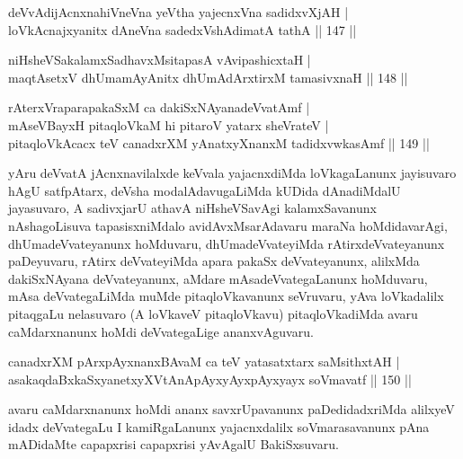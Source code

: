 \begin{shl}
deVvAdijAcnxnahiVneVna yeV\s tha yajecnxVna sadidxvXjAH | \\
loVkAcnajxyanitx dAneVna sadedxVshAdimatA tathA \hfill|| 147 || 
\end{shl}

\begin{shl}
niHsheVSakalamxSadhavxMsitapasA vA\s vipashicxtaH | \\
maqtAsetxV dhUmamAyAnitx dhUmAdArxtirxM tamasivxnaH \hfill|| 148 || 
\end{shl}

\begin{shl}
rAterxVraparapakaSxM ca dakiSxNAyanadeVvatAmf | \\
mAseVBayxH pitaqloVkaM hi pitaroV yatarx sheVrateV | \\
pitaqloVkAcacx teV canadxrXM yAnatxyXnanxM tadidxvwkasAmf \hfill|| 149 || 
\end{shl}

\begin{artha}
yAru deVvatA jAcnxnavilalxde keVvala yajacnxdiMda loVkagaLanunx
jayisuvaro hAgU satfpAtarx, deVsha modalAdavugaLiMda kUDida
dAnadiMdalU jayasu\-varo, A sadivxjarU athavA niHsheVSavAgi
kalamxSavanunx nAshagoLisuva tapasisx\-niMdalo avidAvxMsarAdavaru maraNa
hoMdidavarAgi, dhUmadeVvateyanunx hoMduvaru, dhUmadeVvateyiMda
rAtirxdeVvateyanunx paDeyuvaru, rAtirx deVvateyiMda apara pakaSx
deVvateyanunx, alilxMda dakiSxNAyana deVvateyanunx, aMdare
mAsadeVvate\-gaLanunx hoMduvaru, mAsa deVvategaLiMda muMde
pitaqloVkavanunx seVruvaru, yAva loVkadalilx pitaqgaLu nelasuvaro
(A loVkaveV pitaqloVkavu) pitaqloVkadiMda avaru caMdarxnanunx hoMdi
deVvategaLige ananxvAguvaru.
\end{artha}


\begin{shl}
canadxrXM pArxpAyxnanxBAvaM ca teV yatasatxtarx saMsithxtAH | \\
asakaqdaBxkaSxyanetxyXVtAnApAyxyAyx\s \s pAyxyayx soVmavatf \hfill|| 150 || 
\end{shl}

\begin{artha}
avaru caMdarxnanunx hoMdi ananx savxrUpavanunx paDedidadxriMda
alilxyeV idadx deVvategaLu I kamiRgaLanunx yajacnxdalilx
soVmarasavanunx pAna mADidaMte capapxrisi capapxrisi yAvAgalU
BakiSxsuvaru.
\end{artha}

